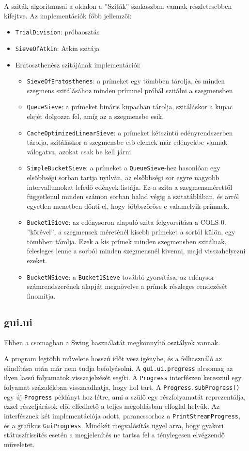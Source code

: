 A sziták algoritmusai a \pageref{sec:szitak} oldalon a ''Sziták'' szakaszban vannak részletesebben kifejtve.
Az implementációk főbb jellemzői:
\begin{itemize}
\item \texttt{TrialDivision}: próbaosztás
\item \texttt{SieveOfAtkin}: Atkin szitája
\item Eratoszthenész szitájának implementációi:
\begin{itemize}
\item \texttt{SieveOfEratosthenes}: a prímeket egy tömbben tárolja, és minden szegmens szitálásához minden prímmel próbál szitálni a szegmensben
\item \texttt{QueueSieve}: a prímeket bináris kupacban tárolja, szitáláskor a kupac elejét dolgozza fel, amíg az a szegmensbe esik.
\item \texttt{CacheOptimizedLinearSieve}: a prímeket kétszintű edényrendszerben tárolja, szitáláskor a szegmensbe eső elemek már edényekbe vannak válogatva, azokat csak be kell járni
\item \texttt{SimpleBucketSieve}: a prímeket a \texttt{QueueSieve}-hez hasonlóan egy elsőbbségi sorban tartja nyilván, az elsőbbségi sor egyre nagyobb intervallumokat lefedő edények listája. Ez a szita a szegmensmérettől függetlenül minden számon sorban halad végig a szitatáblában, és arról egyetlen menetben dönti el, hogy többszöröse-e valamelyik prímnek.
\item \texttt{Bucket1Sieve}: az edénysoron alapuló szita felgyorsítása a COLS 0. ''körével'', a szegmensek méreténél kisebb prímeket a sortól külön, egy tömbben tárolja. Ezek a kis prímek minden szegmensben szitálnak, felesleges lenne a sorból minden szegmensnél kivenni, majd visszahelyezni ezeket.
\item \texttt{BucketNSieve}: a \texttt{Bucket1Sieve} további gyorsítása, az edénysor számrendszerének alapját megnövelve a prímek részleges rendezését finomítja.
\end{itemize}
\end{itemize}

\subsection{gui.ui}

Ebben a csomagban a Swing használatát megkönnyítő osztályok vannak.

A program legtöbb művelete hosszú időt vesz igénybe, és a felhasználó az elindítása után már nem tudja befolyásolni.
A \texttt{gui.ui.progress} alcsomag az ilyen lassú folyamatok visszajelzését segíti.
A \texttt{Progress} interfészen keresztül egy folyamat százalékban visszaadhatja, hogy hol tart.
A \texttt{Progress.subProgress()} egy új \texttt{Progress} példányt hoz létre, ami a szülő egy részfolyamatát reprezentálja, ezzel részeljárások elöl elfedhető a teljes megoldásban elfoglal helyük.
Az interfésznek két implementációja adott, parancssorhoz a \texttt{PrintStreamProgress}, és a grafikus \texttt{GuiProgress}.
Mindkét megvalósítás ügyel arra, hogy gyakori státuszfrissítés esetén a megjelenítés ne tartsa fel a ténylegesen elvégzendő műveletet.

